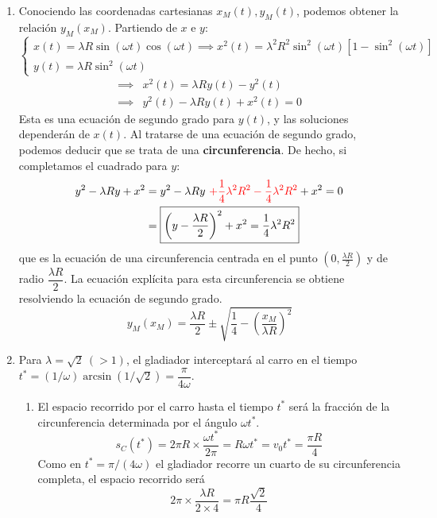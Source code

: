 \documentclass{article}
\begin{document}
\begin{enumerate}
    \item Conociendo las coordenadas cartesianas $x_M(t),y_M(t)$, podemos obtener la relación $y_M(x_M)$. Partiendo de $x$ e $y$:
    $$
    \begin{cases}
        x(t)=\lambda R \sin(\omega t) \cos(\omega t)\implies x^2(t)=\lambda ^2 R^2 \sin^2(\omega t)\left [1-\sin^2(\omega t) \right ]\\
        y(t)=\lambda R \sin^2 (\omega t)
    \end{cases}
    $$
    \begin{equation*}
        \begin{split}
            \implies &x^2(t)=\lambda R y(t)-y^2(t)\\
            \implies &\boxed{y^2(t)-\lambda R y(t) +x^2(t)=0}
        \end{split}
    \end{equation*}
    Esta es una ecuación de segundo grado para $y(t)$, y las soluciones dependerán de $x(t)$. Al tratarse de una ecuación de segundo grado, podemos deducir que se trata de una \textbf{circunferencia}. De hecho, si completamos el cuadrado para $y$:
    \begin{equation*}
        \begin{split}
            y^2-\lambda R y +x^2&=y^2-\lambda R y \ \textcolor{red}{+\frac{1}{4}\lambda ^2 R^2-\frac{1}{4}\lambda ^2 R^2}+x^2=0\\
            &=\boxed{\left ( y-\frac{\lambda R}{2} \right )^2 +x^2=\frac{1}{4}\lambda ^2 R^2}
        \end{split}
    \end{equation*}
    que es la ecuación de una circunferencia centrada en el punto $\displaystyle{\left ( 0,\frac{\lambda R}{2} \right )}$ y de radio $\dfrac{\lambda R}{2}$. La ecuación explícita para esta circunferencia se obtiene resolviendo la ecuación de segundo grado.
    $$
    \boxed{y_M(x_M)=\frac{\lambda R}{2}\pm \sqrt{\frac{1}{4}-\left ( \frac{x_M}{\lambda R} \right )^2}}
    $$

    \item Para $\lambda =\sqrt{2}\ (>1)$, el gladiador interceptará al carro en el tiempo $t^*=(1/\omega )\arcsin(1/\sqrt{2})=\dfrac{\pi}{4\omega }$.
    \begin{enumerate}
        \item El espacio recorrido por el carro hasta el tiempo $t^*$ será la fracción de la circunferencia determinada por el ángulo $\omega t^*$. 
        $$
        s_C(t^*)=2\pi R \times \frac{\omega t^*}{2\pi }=R\omega t^*=v_0 t^*=\boxed{\frac{\pi R }{4}}
        $$
        Como en $t^*=\pi /(4\omega )$ el gladiador recorre un cuarto de su circunferencia completa, el espacio recorrido será 
        $$2\pi \times \displaystyle{\frac{\lambda R}{2\times 4}}=\boxed{\pi R\dfrac{\sqrt{2}}{4}}$$


\end{enumerate}
\end{enumerate}
\end{document}
